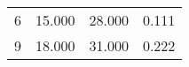 % 
\begin{tabular}{cccc}
  \hline
  \hline
6 & 15.000 & 28.000 & 0.111 \\ 
  9 & 18.000 & 31.000 & 0.222 \\ 
   \hline
\end{tabular}
